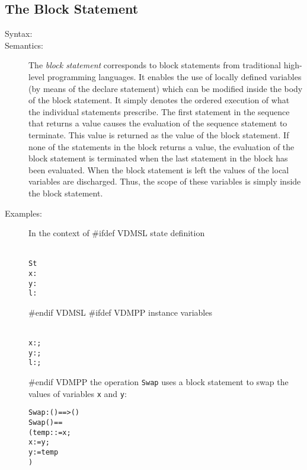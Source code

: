\documentclass[\pformat,12pt]{article}
\begin{document}
\subsection{The Block Statement} \label{dcl-stmt}

\begin{description}
\item[Syntax:]




\item[Semantics:] The {\it block statement} corresponds to block statements
  from traditional high-level programming languages.  It enables the use of
  locally defined variables (by means of the declare statement) which can
  be modified inside the body of the block statement. It simply denotes the
  ordered execution of what the individual statements prescribe. The first
  statement in the sequence that returns a value causes the evaluation of
  the sequence statement to terminate. This value is returned as the
  value of the block statement. If none of the statements in the block
  returns a value, the evaluation of the block statement is terminated when
  the last statement in the block has been evaluated. When the block
  statement is left the values of the local variables are discharged. Thus,
  the scope of these variables is simply inside the block statement.
      
\item[Examples:] In the context of 
#ifdef VDMSL
state definition
  \begin{alltt}\label{stdef}
   St 
    x:
    y:
    l:
  \end{alltt}
#endif VDMSL
#ifdef VDMPP
instance variables
  \begin{alltt}\label{stdef}
    x:;
    y:;
    l:;
  \end{alltt}
#endif VDMPP
  the operation \texttt{Swap} uses a block statement to swap the values of 
  variables \texttt{x} and \texttt{y}:
  \begin{alltt}
  Swap : () ==> ()
  Swap () ==
    ( temp:  := x;
     x := y;
     y := temp
    )
  \end{alltt}

\end{description}
\end{document}
